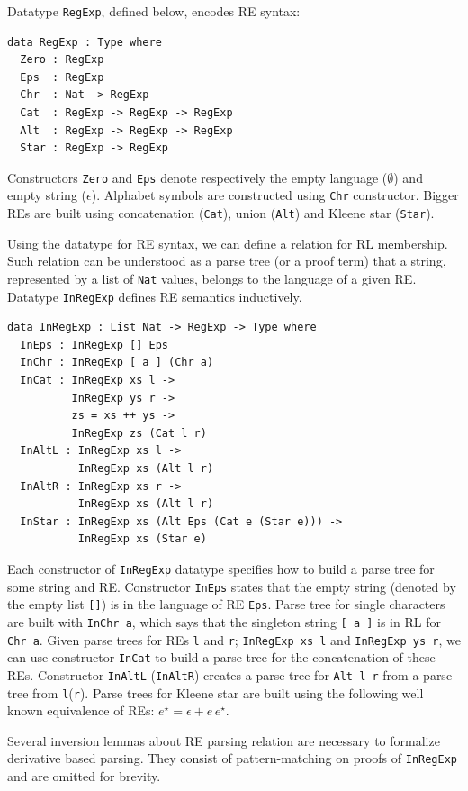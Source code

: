 \documentclass{llncs}
\newcommand{\idris}[1]{\texttt{#1}}%
\begin{document}
Datatype \idris{RegExp}, defined below, encodes RE syntax:
\begin{verbatim}
data RegExp : Type where
  Zero : RegExp
  Eps  : RegExp
  Chr  : Nat -> RegExp
  Cat  : RegExp -> RegExp -> RegExp
  Alt  : RegExp -> RegExp -> RegExp
  Star : RegExp -> RegExp
\end{verbatim}
Constructors \idris{Zero} and \idris{Eps} denote respectively the
empty language ($\emptyset$) and empty string ($\epsilon$). Alphabet
symbols are constructed using \idris{Chr} constructor. Bigger REs are
built using concatenation (\idris{Cat}), union (\idris{Alt}) and
Kleene star (\idris{Star}).

Using the datatype for RE syntax, we can define a relation for RL
membership. Such relation can be understood as a parse tree (or a
proof term) that a string, represented by a list of \idris{Nat}
values, belongs to the language of a given
RE. Datatype \idris{InRegExp} defines RE semantics inductively.

\begin{verbatim}
data InRegExp : List Nat -> RegExp -> Type where
  InEps : InRegExp [] Eps
  InChr : InRegExp [ a ] (Chr a)
  InCat : InRegExp xs l ->
          InRegExp ys r ->
          zs = xs ++ ys ->
          InRegExp zs (Cat l r)
  InAltL : InRegExp xs l ->
           InRegExp xs (Alt l r)
  InAltR : InRegExp xs r ->
           InRegExp xs (Alt l r)
  InStar : InRegExp xs (Alt Eps (Cat e (Star e))) ->
           InRegExp xs (Star e)
\end{verbatim}

Each constructor of \idris{InRegExp} datatype specifies how to build a
parse tree for some string and RE. Constructor \idris{InEps} states
that the empty string (denoted by the empty list \idris{[]}) is in the
language of RE \idris{Eps}. Parse tree for single characters are built
with \idris{InChr a}, which says that the singleton string
\idris{[ a ]} is in RL for \idris{Chr a}. Given parse trees for REs
\idris{l} and \idris{r}; \idris{InRegExp xs l} and \idris{InRegExp ys
  r}, we can use constructor \idris{InCat} to build a parse tree for the
concatenation of these REs. Constructor \idris{InAltL}
(\idris{InAltR}) creates a parse tree for \idris{Alt l r} from a parse
tree from \idris{l}(\idris{r}). Parse trees for Kleene star are built
using the following well known equivalence of REs: $e^\star = \epsilon
+ e\,e^\star$.

Several inversion lemmas about RE parsing relation are necessary to
formalize derivative based parsing. They consist of pattern-matching
on proofs of \idris{InRegExp} and are omitted for brevity.
\end{document}
